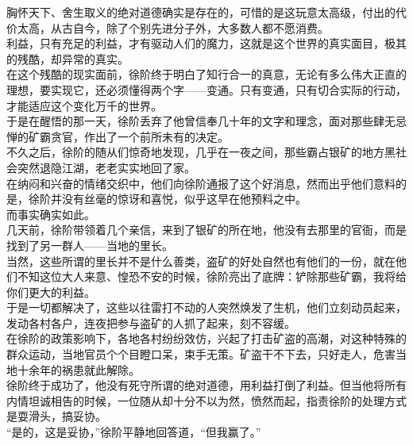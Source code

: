 \begin{multicols}{\theparacolNo}
胸怀天下、舍生取义的绝对道德确实是存在的，可惜的是这玩意太高级，付出的代价太高，从古自今，除了个别先进分子外，大多数人都不愿消费。\\

利益，只有充足的利益，才有驱动人们的魔力，这就是这个世界的真实面目，极其的残酷，却异常的真实。\\

在这个残酷的现实面前，徐阶终于明白了知行合一的真意，无论有多么伟大正直的理想，要实现它，还必须懂得两个字——变通。只有变通，只有切合实际的行动，才能适应这个变化万千的世界。\\

于是在醒悟的那一天，徐阶丢弃了他曾信奉几十年的文字和理念，面对那些肆无忌惮的矿霸贪官，作出了一个前所未有的决定。\\

不久之后，徐阶的随从们惊奇地发现，几乎在一夜之间，那些霸占银矿的地方黑社会突然退隐江湖，老老实实地回了家。\\

在纳闷和兴奋的情绪交织中，他们向徐阶通报了这个好消息，然而出乎他们意料的是，徐阶并没有丝毫的惊讶和喜悦，似乎这早在他预料之中。\\

而事实确实如此。\\

几天前，徐阶带领着几个亲信，来到了银矿的所在地，他没有去那里的官衙，而是找到了另一群人——当地的里长。\\

当然，这些所谓的里长并不是什么善类，盗矿的好处自然也有他们的一份，就在他们不知这位大人来意、惶恐不安的时候，徐阶亮出了底牌：铲除那些矿霸，我将给你们更大的利益。\\

于是一切都解决了，这些以往雷打不动的人突然焕发了生机，他们立刻动员起来，发动各村各户，连夜把参与盗矿的人抓了起来，刻不容缓。\\

在徐阶的政策影响下，各地各村纷纷效仿，兴起了打击矿盗的高潮，对这种特殊的群众运动，当地官员个个目瞪口呆，束手无策。矿盗干不下去，只好走人，危害当地十余年的祸患就此解除。\\

徐阶终于成功了，他没有死守所谓的绝对道德，用利益打倒了利益。但当他将所有内情坦诚相告的时候，一位随从却十分不以为然，愤然而起，指责徐阶的处理方式是耍滑头，搞妥协。\\

“是的，这是妥协，”徐阶平静地回答道，“但我赢了。”\\


\end{multicols}
